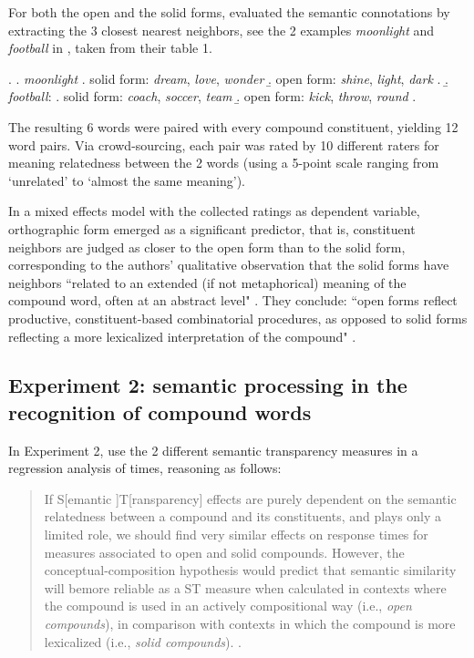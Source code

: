 For both the open and the solid forms, \citet{Marellietal:2014}
evaluated the semantic connotations by extracting the 3 closest
nearest neighbors, see the 2 examples \emph{moonlight} and
\emph{football} in \Next, taken from their table 1. 

\ex. \a. \emph{moonlight}
\a. solid form: \emph{dream}, \emph{love}, \emph{wonder}
\b. open form: \emph{shine}, \emph{light}, \emph{dark}
\z. 
\b. \emph{football}: 
\a. solid form: \emph{coach}, \emph{soccer}, \emph{team}
\b. open form: \emph{kick}, \emph{throw}, \emph{round}
\z.

The resulting 6 words were paired with every
compound constituent, yielding 12 word pairs. Via crowd-sourcing, each
pair was rated by 10
different raters for meaning relatedness between the 2 words (using
a 5-point scale ranging from `unrelated' to `almost the same meaning').

In a mixed effects model with the collected ratings as dependent
variable, orthographic form emerged as a significant predictor, that
is, constituent neighbors are judged as closer to the open form than
to the solid form, corresponding to the authors' qualitative
observation that the solid forms have neighbors ``related to an extended
(if not metaphorical) meaning of the compound word, often at an
abstract level" \citep[1426]{Marellietal:2014}. They conclude: ``open forms reflect productive, constituent-based combinatorial procedures, as opposed to solid forms reflecting a more lexicalized interpretation
of the compound" \citep[1426]{Marellietal:2014}.

\subsection[Experiment 2: semantic processing]{Experiment 2: semantic processing in the recognition of
  compound words}
\label{sec:marelli-et-al-2014-ex2}

In Experiment 2, \citet{Marellietal:2014} use the 2 different semantic transparency
measures in a regression analysis of  times, reasoning
as follows:
\begin{quotation}
If S[emantic ]T[ransparency] effects are purely dependent on the semantic relatedness between a compound and its constituents, and
 plays only a limited role, we should find very similar effects on
response times for measures associated to open and solid compounds. However,
the conceptual-composition hypothesis would predict that semantic similarity will
be\linebreak[3] more reliable as a ST measure when calculated in contexts where the com\-pound
is used in an actively compositional way (i.e., \emph{open compounds}), in comparison
with contexts in which the compound is more lexicalized (i.e., \emph{solid
compounds}). \citep[1427]{Marellietal:2014}.
  \end{quotation}

